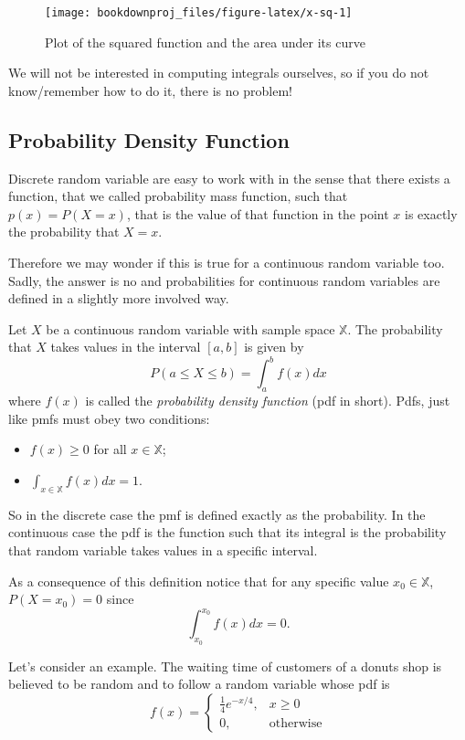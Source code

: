 \documentclass[
]{book}
\theoremstyle{definition}
\theoremstyle{definition}
\theoremstyle{definition}
\theoremstyle{definition}
\theoremstyle{remark}
\begin{document}
\begin{figure}

{\centering \texttt{[image: bookdownproj\_files/figure-latex/x-sq-1]} 

}

\caption{Plot of the squared function and the area under its curve}\label{fig:x-sq}
\end{figure}

We will not be interested in computing integrals ourselves, so if you do not know/remember how to do it, there is no problem!

\hypertarget{probability-density-function}{%
\subsection{Probability Density Function}\label{probability-density-function}}

Discrete random variable are easy to work with in the sense that there exists a function, that we called probability mass function, such that \(p(x)=P(X=x)\), that is the value of that function in the point \(x\) is exactly the probability that \(X=x\).

Therefore we may wonder if this is true for a continuous random variable too. Sadly, the answer is no and probabilities for continuous random variables are defined in a slightly more involved way.

Let \(X\) be a continuous random variable with sample space \(\mathbb{X}\). The probability that \(X\) takes values in the interval \([a,b]\) is given by
\[
P(a\leq X \leq b) = \int_{a}^bf(x)dx
\]
where \(f(x)\) is called the \emph{probability density function} (pdf in short). Pdfs, just like pmfs must obey two conditions:

\begin{itemize}
\item
  \(f(x)\geq 0\) for all \(x\in\mathbb{X}\);
\item
  \(\int_{x\in\mathbb{X}}f(x)dx=1\).
\end{itemize}

So in the discrete case the pmf is defined exactly as the probability. In the continuous case the pdf is the function such that its integral is the probability that random variable takes values in a specific interval.

As a consequence of this definition notice that for any specific value \(x_0\in\mathbb{X}\), \(P(X=x_0)=0\) since
\[
\int_{x_0}^{x_0}f(x)dx = 0.
\]

Let's consider an example. The waiting time of customers of a donuts shop is believed to be random and to follow a random variable whose pdf is
\[
f(x) = \left\{
\begin{array}{ll}
\frac{1}{4}e^{-x/4}, & x\geq 0\\
0, & \mbox{otherwise}
\end{array}
\right.
\]
\end{document}
